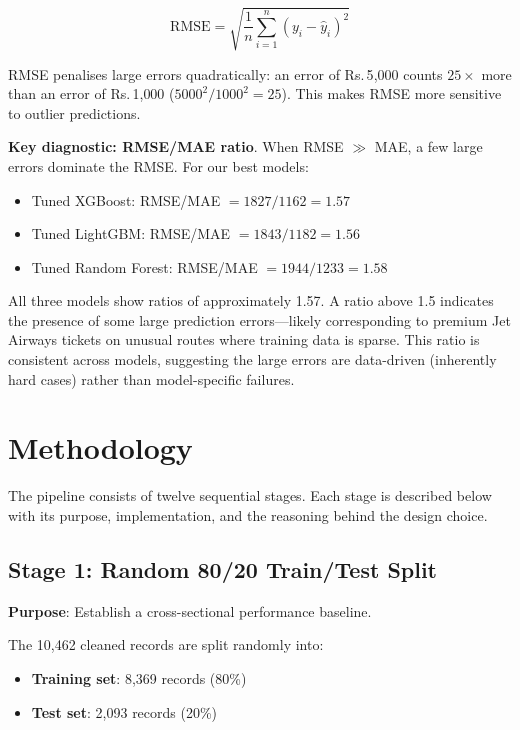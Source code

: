 \documentclass[12pt, a4paper]{article}
\begin{document}
\begin{equation}
\text{RMSE} = \sqrt{\frac{1}{n}\sum_{i=1}^{n}(y_i - \hat{y}_i)^2}
\end{equation}

RMSE penalises large errors quadratically: an error of Rs.\,5{,}000 counts
$25\times$ more than an error of Rs.\,1{,}000 ($5000^2 / 1000^2 = 25$).
This makes RMSE more sensitive to outlier predictions.

\textbf{Key diagnostic: RMSE/MAE ratio}. When RMSE $\gg$ MAE, a few large
errors dominate the RMSE.  For our best models:
\begin{itemize}
    \item Tuned XGBoost: RMSE/MAE $= 1827/1162 = 1.57$
    \item Tuned LightGBM: RMSE/MAE $= 1843/1182 = 1.56$
    \item Tuned Random Forest: RMSE/MAE $= 1944/1233 = 1.58$
\end{itemize}

All three models show ratios of approximately 1.57.  A ratio above 1.5 indicates
the presence of some large prediction errors---likely corresponding to premium
Jet Airways tickets on unusual routes where training data is sparse.  This ratio
is consistent across models, suggesting the large errors are data-driven
(inherently hard cases) rather than model-specific failures.

\section{Methodology}
\label{sec:method}

The pipeline consists of twelve sequential stages.  Each stage is described
below with its purpose, implementation, and the reasoning behind the design choice.

\subsection{Stage 1: Random 80/20 Train/Test Split}

\textbf{Purpose}: Establish a cross-sectional performance baseline.

The 10{,}462 cleaned records are split randomly into:
\begin{itemize}
    \item \textbf{Training set}: 8{,}369 records (80\%)
    \item \textbf{Test set}: 2{,}093 records (20\%)
\end{itemize}
\end{document}
